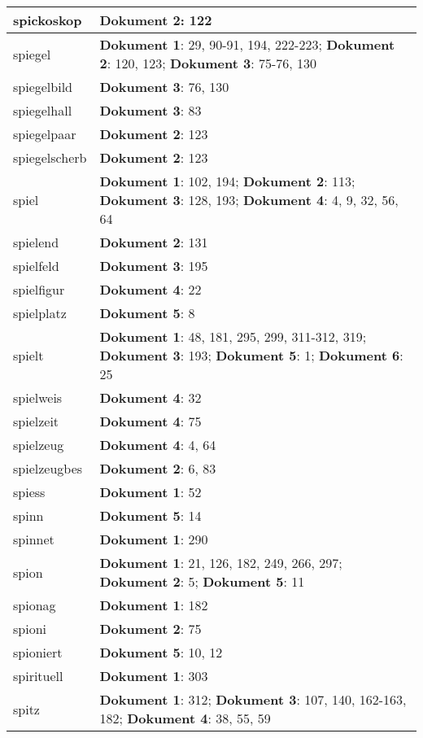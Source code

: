 \documentclass[a5paper]{article}
\begin{document}
\begin{longtable}[l]{|l|p{3in}|}
\hline
spickoskop & \textbf{Dokument 2}: 122 \\
\hline
spiegel & \textbf{Dokument 1}: 29, 90-91, 194, 222-223; \textbf{Dokument 2}: 120, 123; \textbf{Dokument 3}: 75-76, 130 \\
\hline
spiegelbild & \textbf{Dokument 3}: 76, 130 \\
\hline
spiegelhall & \textbf{Dokument 3}: 83 \\
\hline
spiegelpaar & \textbf{Dokument 2}: 123 \\
\hline
spiegelscherb & \textbf{Dokument 2}: 123 \\
\hline
spiel & \textbf{Dokument 1}: 102, 194; \textbf{Dokument 2}: 113; \textbf{Dokument 3}: 128, 193; \textbf{Dokument 4}: 4, 9, 32, 56, 64 \\
\hline
spielend & \textbf{Dokument 2}: 131 \\
\hline
spielfeld & \textbf{Dokument 3}: 195 \\
\hline
spielfigur & \textbf{Dokument 4}: 22 \\
\hline
spielplatz & \textbf{Dokument 5}: 8 \\
\hline
spielt & \textbf{Dokument 1}: 48, 181, 295, 299, 311-312, 319; \textbf{Dokument 3}: 193; \textbf{Dokument 5}: 1; \textbf{Dokument 6}: 25 \\
\hline
spielweis & \textbf{Dokument 4}: 32 \\
\hline
spielzeit & \textbf{Dokument 4}: 75 \\
\hline
spielzeug & \textbf{Dokument 4}: 4, 64 \\
\hline
spielzeugbes & \textbf{Dokument 2}: 6, 83 \\
\hline
spiess & \textbf{Dokument 1}: 52 \\
\hline
spinn & \textbf{Dokument 5}: 14 \\
\hline
spinnet & \textbf{Dokument 1}: 290 \\
\hline
spion & \textbf{Dokument 1}: 21, 126, 182, 249, 266, 297; \textbf{Dokument 2}: 5; \textbf{Dokument 5}: 11 \\
\hline
spionag & \textbf{Dokument 1}: 182 \\
\hline
spioni & \textbf{Dokument 2}: 75 \\
\hline
spioniert & \textbf{Dokument 5}: 10, 12 \\
\hline
spirituell & \textbf{Dokument 1}: 303 \\
\hline
spitz & \textbf{Dokument 1}: 312; \textbf{Dokument 3}: 107, 140, 162-163, 182; \textbf{Dokument 4}: 38, 55, 59 \\

\end{longtable}
\end{document}
